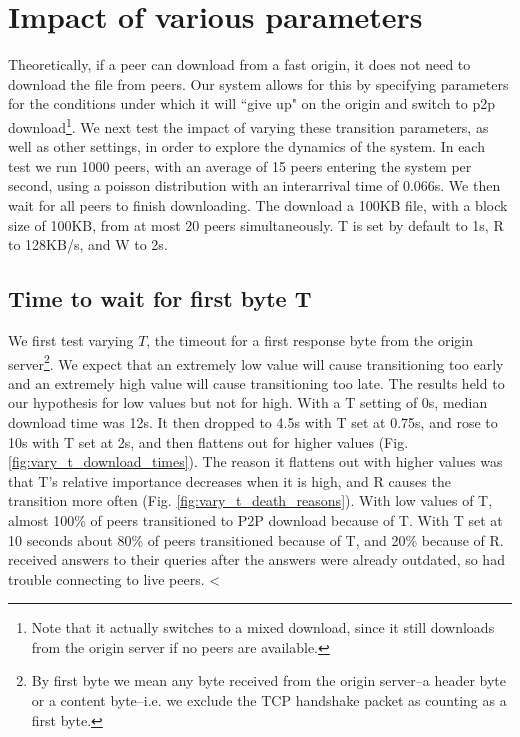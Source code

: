 \section{Impact of various parameters}

Theoretically, if a peer can download from a fast origin, it does not need to download the file from 
peers. Our system allows for this by specifying parameters for the conditions under which it will 
``give up" on the origin and switch to p2p download\footnote{Note that it actually switches to 
a mixed download, since it still downloads from the origin server if no peers are available.}. We 
next test the impact of varying these transition parameters, as well as other settings, in order 
to explore the dynamics of the system. In each test we run 1000 peers, with an average of 15 peers entering 
the system per second, using a poisson distribution with an interarrival time of 0.066s. We then 
wait for all peers to finish downloading. The download a 100KB file, with a block size of 100KB, from 
at most 20 peers simultaneously. T is set by default to 1s, R to 128KB/s, and W to 2s. 
\subsection{Time to wait for first byte T}

We first test varying $T$, the timeout for a first response byte from the origin server\footnote{By 
first byte we mean any byte received from the origin server--a header byte or a content byte--i.e. 
we exclude the TCP handshake packet as counting as a first byte.}. We expect that an extremely low value will cause transitioning too early and an extremely high value 
will cause transitioning too late. The results held to our hypothesis for low values but not for 
high. With a T setting of 0s, median download time was 12s. It then dropped to 4.5s with T set at 0.75s, 
and rose to 10s with T set at 2s, and then flattens out for higher values (Fig. \ref{fig:vary_t_download_times}). 
The reason it flattens out with higher values was that T's relative importance decreases when it 
is high, and R causes the transition more often (Fig. \ref{fig:vary_t_death_reasons}). With 
low values of T, almost 100\% of peers transitioned to P2P download because of T. With T set at 10 seconds 
about 80\% of peers transitioned because of T, and 20\% because of R. 
received answers to their queries after the answers were already outdated, so had trouble connecting 
to live peers. 
<%


